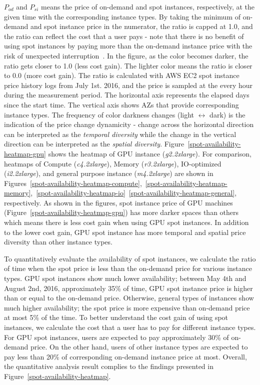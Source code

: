 \documentclass[conference]{IEEEtran}
\begin{document}
$P_{od}$ and $P_{si}$ means the price of on-demand and spot instances, respectively, at the given time with the corresponding instance types. By taking the minimum of on-demand and spot instance price in the numerator, the ratio is capped at 1.0, and the ratio can reflect the cost that a user pays - note that there is no benefit of using spot instances by paying more than the on-demand instance price with the risk of unexpected interruption~\cite{not-bid-cloud}. In the figure, as the color becomes darker, the ratio gets closer to 1.0 (less cost gain). The lighter color means the ratio is closer to 0.0 (more cost gain). The ratio is calculated with AWS EC2 spot instance price history logs from July 1st. 2016, and the price is sampled at the every hour during the measurement period. The horizontal axis represents the elapsed days since the start time. The vertical axis shows AZs that provide corresponding instance types. The frequency of color darkness changes (light $\leftrightarrow$ dark) is the indication of the price change dynamicity - change across the horizontal direction can be interpreted as the \emph{temporal diversity} while the change in the vertical direction can be interpreted as the \emph{spatial diversity}. Figure~\ref{spot-availability-heatmap-gpu} shows the heatmap of GPU instance (\textit{g2.2xlarge}). For comparison, heatmaps of Compute (\textit{c4.2xlarge}), Memory (\textit{r3.2xlarge}), IO-optimized (\textit{i2.2xlarge}), and general purpose instance (\textit{m4.2xlarge}) are shown in Figures~\ref{spot-availability-heatmap-compute},~\ref{spot-availability-heatmap-memory},~\ref{spot-availability-heatmap-io}~\ref{spot-availability-heatmap-general}, respectively. As shown in the figures, spot instance price of GPU machines (Figure~\ref{spot-availability-heatmap-gpu}) has more darker spaces than others which means there is less cost gain when using GPU spot instances. In addition to the lower cost gain, GPU spot instance has more temporal and spatial price diversity than other instance types. 

To quantitatively evaluate the availability of spot instances, we calculate the ratio of time when the spot price is less than the on-demand price for various instance types. GPU spot instances show much lower availability; between May 4th and August 2nd, 2016, approximately 35\% of time, GPU spot instance price is higher than or equal to the on-demand price. Otherwise, general types of instances show much higher availability; the spot price is more expensive than on-demand price at most 5\% of the time. To better understand the cost gain of using spot instances, we calculate the cost that a user has to pay for different instance types. For GPU spot instances, users are expected to pay approximately 30\% of on-demand price. On the other hand, users of other instance types are expected to pay less than 20\% of corresponding on-demand instance price at most. Overall, the quantitative analysis result complies to the findings presented in Figure~\ref{spot-availability-heatmap}.
  
\end{document}
